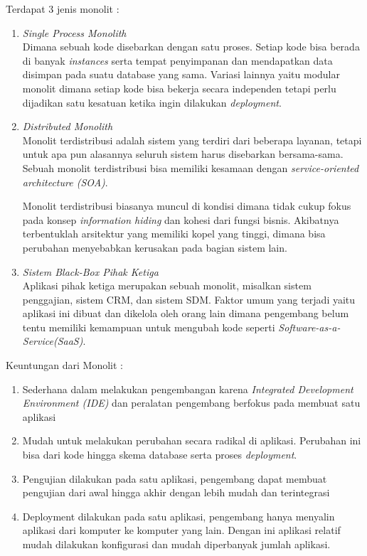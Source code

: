 Terdapat 3 jenis monolit \cite{6}:
\begin{enumerate}[leftmargin=1.3cm]
\item \textit{Single Process Monolith}\\
Dimana sebuah kode disebarkan dengan satu proses. Setiap kode bisa berada di banyak \textit{instances} serta tempat penyimpanan dan mendapatkan data disimpan pada suatu database yang sama. Variasi lainnya yaitu modular monolit dimana setiap kode bisa bekerja secara independen tetapi perlu dijadikan satu kesatuan ketika ingin dilakukan \textit{deployment}.
\item \textit{Distributed Monolith}\\
Monolit terdistribusi adalah sistem yang terdiri dari beberapa layanan, tetapi untuk apa pun alasannya seluruh sistem harus disebarkan bersama-sama. Sebuah monolit terdistribusi bisa memiliki kesamaan dengan \textit{service-oriented architecture (SOA)}.

Monolit terdistribusi biasanya muncul  di kondisi dimana tidak cukup fokus pada konsep \textit{information hiding} dan kohesi dari fungsi bisnis. Akibatnya terbentuklah arsitektur yang memiliki kopel yang tinggi, dimana bisa perubahan menyebabkan kerusakan pada bagian sistem lain.
\item \textit{Sistem Black-Box Pihak Ketiga}\\
Aplikasi pihak ketiga merupakan sebuah monolit, misalkan sistem penggajian, sistem CRM, dan sistem SDM. Faktor umum yang terjadi yaitu aplikasi ini dibuat dan dikelola oleh orang lain dimana pengembang belum tentu memiliki kemampuan untuk mengubah kode seperti \textit{Software-as-a-Service(SaaS)}.
\end{enumerate}

Keuntungan dari Monolit \cite{6,8}:
\begin{enumerate}[leftmargin=1.3cm]
\item Sederhana dalam melakukan pengembangan karena \textit{Integrated Development Environment (IDE)} dan peralatan pengembang berfokus pada membuat satu aplikasi
\item Mudah untuk melakukan perubahan secara radikal di aplikasi. Perubahan ini bisa dari kode hingga skema database serta proses \textit{deployment}.
\item Pengujian dilakukan pada satu aplikasi, pengembang dapat membuat pengujian dari awal hingga akhir dengan lebih mudah dan terintegrasi
\item Deployment dilakukan pada satu aplikasi, pengembang hanya menyalin aplikasi dari komputer ke komputer yang lain. Dengan ini aplikasi relatif mudah dilakukan konfigurasi dan mudah diperbanyak jumlah aplikasi.
\end{enumerate}

